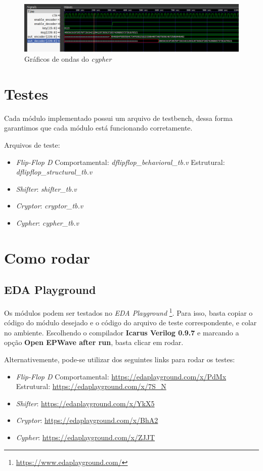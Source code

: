 \documentclass{article}
\begin{document}
\begin{figure}[H]
    \centering
    \includegraphics[width=\textwidth]{images/cypher_wave.png}
    \caption{Gráficos de ondas do \emph{cypher}}
    \label{fig:cypher_wave}
\end{figure}


\section{Testes}

Cada módulo implementado possui um arquivo de testbench, dessa forma garantimos que cada módulo está funcionando corretamente. 

Arquivos de teste:
\begin{itemize}
    \item \emph{Flip-Flop D}
        \subitem Comportamental: \emph{dflipflop\_behavioral\_tb.v} 
        \subitem Estrutural: \emph{dflipflop\_structural\_tb.v}
    \item \emph{Shifter}: \emph{shifter\_tb.v}
    \item \emph{Cryptor}: \emph{cryptor\_tb.v}
    \item \emph{Cypher}: \emph{cypher\_tb.v}
\end{itemize}

\section{Como rodar}
\subsection{EDA Playground}

Os módulos podem ser testados no \emph{EDA Playground} \footnote{\url{https://www.edaplayground.com/}}. Para isso, basta copiar o código do módulo desejado e o código do arquivo de teste correspondente, e colar no ambiente. Escolhendo o compilador \textbf{Icarus Verilog 0.9.7} e marcando a opção \textbf{Open EPWave after run}, basta clicar em rodar. 

Alternativemente, pode-se utilizar dos seguintes links para rodar os testes:
\begin{itemize}
    \item \emph{Flip-Flop D}
        \subitem Comportamental: \url{https://edaplayground.com/x/PdMx}
        \subitem Estrutural: \url{https://edaplayground.com/x/7S_N}
    \item \emph{Shifter}: \url{https://edaplayground.com/x/YkX5}
    \item \emph{Cryptor}: \url{https://edaplayground.com/x/BhA2}
    \item \emph{Cypher}: \url{https://edaplayground.com/x/ZJJT}

\end{itemize}
\end{document}
